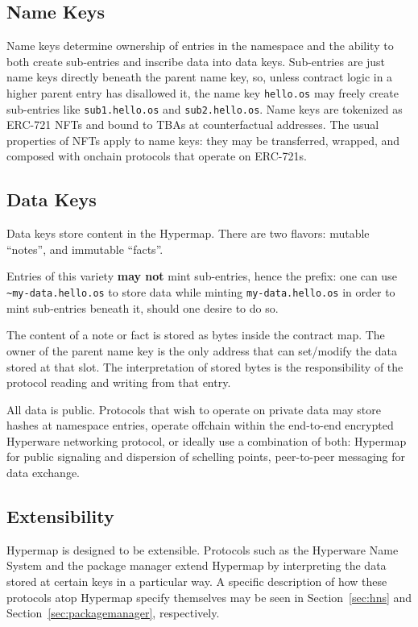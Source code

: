 \documentclass[runningheads]{llncs}
\begin{document}
\subsection{Name Keys}

Name keys determine ownership of entries in the namespace and the ability to both create sub-entries and inscribe data into data keys. Sub-entries are just name keys directly beneath the parent name key, so, unless contract logic in a higher parent entry has disallowed it, the name key \verb|hello.os| may freely create sub-entries like \verb|sub1.hello.os| and \verb|sub2.hello.os|.
Name keys are tokenized as ERC-721 NFTs and bound to TBAs at counterfactual addresses.
The usual properties of NFTs apply to name keys: they may be transferred, wrapped, and composed with onchain protocols that operate on ERC-721s.

\subsection{Data Keys}

Data keys store content in the Hypermap. There are two flavors: mutable ``notes'', and immutable ``facts''.

Entries of this variety \textbf{may not} mint sub-entries, hence the prefix: one can use \verb|~my-data.hello.os| to store data while minting \verb|my-data.hello.os| in order to mint sub-entries beneath it, should one desire to do so.

The content of a note or fact is stored as bytes inside the contract map.
The owner of the parent name key is the only address that can set/modify the data stored at that slot.
The interpretation of stored bytes is the responsibility of the protocol reading and writing from that entry.

All data is public. Protocols that wish to operate on private data may store hashes at namespace entries, operate offchain within the end-to-end encrypted Hyperware networking protocol, or ideally use a combination of both: Hypermap for public signaling and dispersion of schelling points, peer-to-peer messaging for data exchange.

\subsection{Extensibility}
\label{sec:extensibility}

Hypermap is designed to be extensible.
Protocols such as the Hyperware Name System and the package manager extend Hypermap by interpreting the data stored at certain keys in a particular way.
A specific description of how these protocols atop Hypermap specify themselves may be seen in Section~\ref{sec:hns} and Section~\ref{sec:packagemanager}, respectively.
\end{document}
